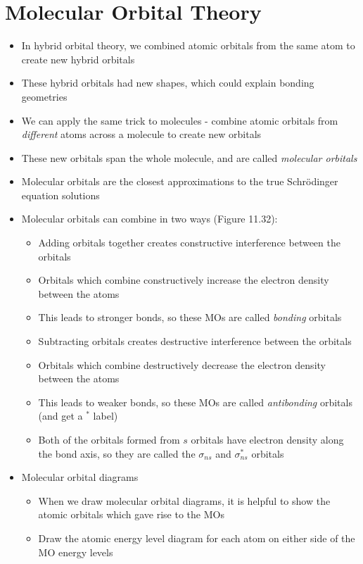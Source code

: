 \documentclass[12pt, openany, letterpaper]{memoir}
\begin{document}
\section{Molecular Orbital Theory}
\begin{itemize}
	\item In hybrid orbital theory, we combined atomic orbitals from the same atom to create new hybrid orbitals
	\item These hybrid orbitals had new shapes, which could explain bonding geometries
	\item We can apply the same trick to molecules - combine atomic orbitals from \emph{different} atoms across a molecule to create new orbitals
	\item These new orbitals span the whole molecule, and are called \emph{molecular orbitals}
	\item Molecular orbitals are the closest approximations to the true Schr\"odinger equation solutions
	\item Molecular orbitals can combine in two ways (Figure 11.32):
	\begin{itemize}
		\item Adding orbitals together creates constructive interference between the orbitals
		\item Orbitals which combine constructively increase the electron density between the atoms
		\item This leads to stronger bonds, so these MOs are called \emph{bonding} orbitals
		\item Subtracting orbitals creates destructive interference between the orbitals
		\item Orbitals which combine destructively decrease the electron density between the atoms
		\item This leads to weaker bonds, so these MOs are called \emph{antibonding} orbitals (and get a $^*$ label)
		\item Both of the orbitals formed from $s$ orbitals have electron density along the bond axis, so they are called the $\sigma_{ns}$ and $\sigma_{ns}^*$ orbitals
	\end{itemize}
	\item Molecular orbital diagrams
	\begin{itemize}
		\item When we draw molecular orbital diagrams, it is helpful to show the atomic orbitals which gave rise to the MOs
		\item Draw the atomic energy level diagram for each atom on either side of the MO energy levels

\end{itemize}
\end{itemize}
\end{document}
